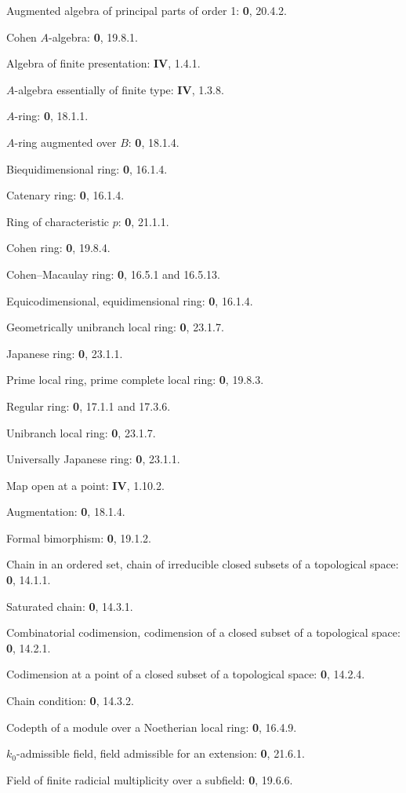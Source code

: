 Augmented algebra of principal parts of order 1: \textbf{0}, 20.4.2.\par
Cohen $A$-algebra: \textbf{0}, 19.8.1.\par
Algebra of finite presentation: \textbf{IV}, 1.4.1.\par
$A$-algebra essentially of finite type: \textbf{IV}, 1.3.8.\par
$A$-ring: \textbf{0}, 18.1.1.\par
$A$-ring augmented over $B$: \textbf{0}, 18.1.4.\par
Biequidimensional ring: \textbf{0}, 16.1.4.\par
Catenary ring: \textbf{0}, 16.1.4.\par
Ring of characteristic $p$: \textbf{0}, 21.1.1.\par
Cohen ring: \textbf{0}, 19.8.4.\par
Cohen--Macaulay ring: \textbf{0}, 16.5.1 and 16.5.13.\par
Equicodimensional, equidimensional ring: \textbf{0}, 16.1.4.\par
Geometrically unibranch local ring: \textbf{0}, 23.1.7.\par
Japanese ring: \textbf{0}, 23.1.1.\par
Prime local ring, prime complete local ring: \textbf{0}, 19.8.3.\par
Regular ring: \textbf{0}, 17.1.1 and 17.3.6.\par
Unibranch local ring: \textbf{0}, 23.1.7.\par
Universally Japanese ring: \textbf{0}, 23.1.1.\par
Map open at a point: \textbf{IV}, 1.10.2.\par
Augmentation: \textbf{0}, 18.1.4.\par

Formal bimorphism: \textbf{0}, 19.1.2.\par

Chain in an ordered set, chain of irreducible closed subsets of a topological space: \textbf{0}, 14.1.1.\par
Saturated chain: \textbf{0}, 14.3.1.\par
Combinatorial codimension, codimension of a closed subset of a topological space: \textbf{0}, 14.2.1.\par
Codimension at a point of a closed subset of a topological space: \textbf{0}, 14.2.4.\par
Chain condition: \textbf{0}, 14.3.2.\par
Codepth of a module over a Noetherian local ring: \textbf{0}, 16.4.9.\par
$k_0$-admissible field, field admissible for an extension: \textbf{0}, 21.6.1.\par
Field of finite radicial multiplicity over a subfield: \textbf{0}, 19.6.6.\par


